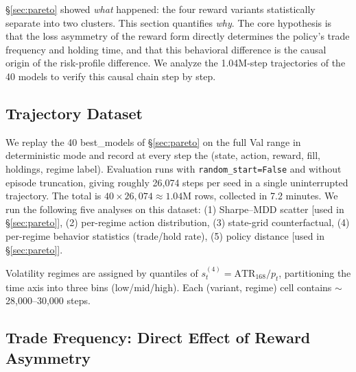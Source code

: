 \documentclass[11pt, a4paper]{article}
\begin{document}
\S\ref{sec:pareto} showed \emph{what} happened: the four reward variants
statistically separate into two clusters. This section quantifies \emph{why}.
The core hypothesis is that the loss asymmetry of the reward form directly
determines the policy's trade frequency and holding time, and that this
behavioral difference is the causal origin of the risk-profile difference.
We analyze the 1.04M-step trajectories of the 40 models to verify this
causal chain step by step.

\subsection{Trajectory Dataset}
\label{sec:mechanism_dataset}

We replay the 40 best\_models of \S\ref{sec:pareto} on the full Val range in
deterministic mode and record at every step the
(state, action, reward, fill, holdings, regime label). Evaluation runs with
\texttt{random\_start=False} and without episode truncation, giving roughly
26{,}074 steps per seed in a single uninterrupted trajectory. The total is
$40 \times 26{,}074 \approx 1.04\text{M}$ rows, collected in 7.2 minutes. We
run the following five analyses on this dataset: (1) Sharpe--MDD scatter
[used in \S\ref{sec:pareto}], (2) per-regime action distribution,
(3) state-grid counterfactual, (4) per-regime behavior statistics
(trade/hold rate), (5) policy distance [used in \S\ref{sec:pareto}].

Volatility regimes are assigned by quantiles of $s_t^{(4)} =
\mathrm{ATR}_{168}/p_t$, partitioning the time axis into three bins
(low/mid/high). Each (variant, regime) cell contains
$\sim$28{,}000--30{,}000 steps.

\subsection{Trade Frequency: Direct Effect of Reward Asymmetry}
\label{sec:mechanism_trade_rate}
\end{document}
